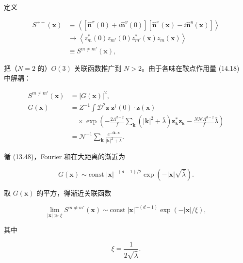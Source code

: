 定义

\begin{align*}
S ^ {+-} ( \mathbf {x} ) & \equiv \left\langle \left[ \hat {\mathbf {n}} ^ {x} ( 0 ) + i \hat {\mathbf {n}} ^ {y} ( 0 ) \right] \left[ \hat {\mathbf {n}} ^ {x} ( \mathbf {x} ) - i \hat {\mathbf {n}} ^ {y} ( \mathbf {x} ) \right] \right\rangle\\
& \rightarrow \left\langle z _ {m} ^ {*} ( 0 ) z _ {m '} ( 0 ) z _ {m '} ^ {*} ( \mathbf {x} ) z _ {m} ( \mathbf {x} ) \right\rangle\\
& \equiv S ^ {m \neq m '} ( \mathbf {x} ) ,
\tag{14.21}
\end{align*}

把（$N=2$ 的）$O(3)$ 关联函数推广到 $N > 2$。由于各味在鞍点作用量 (14.18) 中解耦：

\begin{align*}
S ^ {m \neq m '} ( \mathbf {x} ) & = \left| G ( \mathbf {x} ) \right| ^ {2} ,\\
G ( \mathbf {x} ) & = Z ^ {- 1} \int \mathcal {D} ^ {2} \mathbf {z} \; \mathbf {z} ^ {\dagger} ( 0 ) \cdot \mathbf {z} ( \mathbf {x} )\\
& \quad \times \exp \left( - \frac {2 \Lambda^ {d - 2}}{f} \sum_ {\mathbf {k}} \left( | \mathbf {k} | ^ {2} + \bar {\lambda} \right) \mathbf {z} _ {\mathbf {k}} ^ {*} \mathbf {z} _ {\mathbf {k}} - \frac {N \mathcal {N} \Lambda^ {d - 2}}{f} \bar {\lambda} \right)\\
& = \mathcal {N} ^ {- 1} \sum_ {\mathbf {k}} \frac {e ^ {- i \mathbf {k} \cdot \mathbf {x}}}{| \mathbf {k} | ^ {2} + \bar {\lambda}} .
\tag{14.22}
\end{align*}

循 (13.48)，Fourier 和在大距离的渐近为

\begin{equation*}
G ( \mathbf {x} ) \sim \text{const} \; | \mathbf {x} | ^ {- ( d - 1 )/2} \exp \left( - | \mathbf {x} | \sqrt {\bar {\lambda}} \right).
\tag{14.23}
\end{equation*}

取 $G(\mathbf{x})$ 的平方，得渐近关联函数

\begin{equation*}
\lim_{| \mathbf {x} | \gg \xi} S ^ {m \neq m '} ( \mathbf {x} ) \sim \text{const} \; | \mathbf {x} | ^ {- ( d - 1 )} \exp ( - | \mathbf {x} | / \xi ) ,
\tag{14.24}
\end{equation*}

其中

\begin{equation*}
\xi = \frac {1}{2 \sqrt {\bar {\lambda}}}.
\tag{14.25}
\end{equation*}

